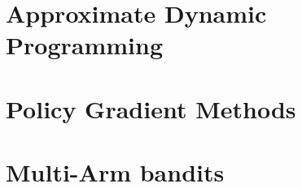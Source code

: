 \documentclass[12pt]{book}
\begin{document}
\chapter{Approximate Dynamic Programming}
\label{chapter:approx-dp}


% 

\chapter{Policy Gradient Methods}
\label{chapter:policy-gradient}


\chapter{Multi-Arm bandits}
\label{chapter:MAB}






\end{document}

